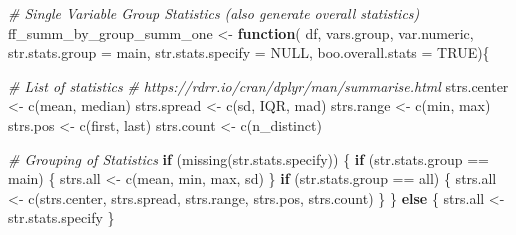 \documentclass[
]{book}
\newenvironment{Shaded}{\begin{snugshade}}{\end{snugshade}}
\newcommand{\AttributeTok}[1]{\textcolor[rgb]{0.77,0.63,0.00}{#1}}
\newcommand{\CommentTok}[1]{\textcolor[rgb]{0.56,0.35,0.01}{\textit{#1}}}
\newcommand{\ConstantTok}[1]{\textcolor[rgb]{0.00,0.00,0.00}{#1}}
\newcommand{\ControlFlowTok}[1]{\textcolor[rgb]{0.13,0.29,0.53}{\textbf{#1}}}
\newcommand{\FunctionTok}[1]{\textcolor[rgb]{0.00,0.00,0.00}{#1}}
\newcommand{\NormalTok}[1]{#1}
\newcommand{\OtherTok}[1]{\textcolor[rgb]{0.56,0.35,0.01}{#1}}
\newcommand{\SpecialCharTok}[1]{\textcolor[rgb]{0.00,0.00,0.00}{#1}}
\newcommand{\StringTok}[1]{\textcolor[rgb]{0.31,0.60,0.02}{#1}}
\begin{document}
\begin{Shaded}
\begin{Highlighting}[]
\CommentTok{\# Single Variable Group Statistics (also generate overall statistics)}
\NormalTok{ff\_summ\_by\_group\_summ\_one }\OtherTok{\textless{}{-}} \ControlFlowTok{function}\NormalTok{(}
\NormalTok{  df, vars.group, var.numeric, }\AttributeTok{str.stats.group =} \StringTok{\textquotesingle{}main\textquotesingle{}}\NormalTok{,}
  \AttributeTok{str.stats.specify =} \ConstantTok{NULL}\NormalTok{, }\AttributeTok{boo.overall.stats =} \ConstantTok{TRUE}\NormalTok{)\{}
  
  \CommentTok{\# List of statistics}
  \CommentTok{\# https://rdrr.io/cran/dplyr/man/summarise.html}
\NormalTok{  strs.center }\OtherTok{\textless{}{-}} \FunctionTok{c}\NormalTok{(}\StringTok{\textquotesingle{}mean\textquotesingle{}}\NormalTok{, }\StringTok{\textquotesingle{}median\textquotesingle{}}\NormalTok{)}
\NormalTok{  strs.spread }\OtherTok{\textless{}{-}} \FunctionTok{c}\NormalTok{(}\StringTok{\textquotesingle{}sd\textquotesingle{}}\NormalTok{, }\StringTok{\textquotesingle{}IQR\textquotesingle{}}\NormalTok{, }\StringTok{\textquotesingle{}mad\textquotesingle{}}\NormalTok{)}
\NormalTok{  strs.range }\OtherTok{\textless{}{-}} \FunctionTok{c}\NormalTok{(}\StringTok{\textquotesingle{}min\textquotesingle{}}\NormalTok{, }\StringTok{\textquotesingle{}max\textquotesingle{}}\NormalTok{)}
\NormalTok{  strs.pos }\OtherTok{\textless{}{-}} \FunctionTok{c}\NormalTok{(}\StringTok{\textquotesingle{}first\textquotesingle{}}\NormalTok{, }\StringTok{\textquotesingle{}last\textquotesingle{}}\NormalTok{)}
\NormalTok{  strs.count }\OtherTok{\textless{}{-}} \FunctionTok{c}\NormalTok{(}\StringTok{\textquotesingle{}n\_distinct\textquotesingle{}}\NormalTok{)}
  
  \CommentTok{\# Grouping of Statistics}
  \ControlFlowTok{if}\NormalTok{ (}\FunctionTok{missing}\NormalTok{(str.stats.specify)) \{}
    \ControlFlowTok{if}\NormalTok{ (str.stats.group }\SpecialCharTok{==} \StringTok{\textquotesingle{}main\textquotesingle{}}\NormalTok{) \{}
\NormalTok{      strs.all }\OtherTok{\textless{}{-}} \FunctionTok{c}\NormalTok{(}\StringTok{\textquotesingle{}mean\textquotesingle{}}\NormalTok{, }\StringTok{\textquotesingle{}min\textquotesingle{}}\NormalTok{, }\StringTok{\textquotesingle{}max\textquotesingle{}}\NormalTok{, }\StringTok{\textquotesingle{}sd\textquotesingle{}}\NormalTok{)}
\NormalTok{    \}}
    \ControlFlowTok{if}\NormalTok{ (str.stats.group }\SpecialCharTok{==} \StringTok{\textquotesingle{}all\textquotesingle{}}\NormalTok{) \{}
\NormalTok{      strs.all }\OtherTok{\textless{}{-}} \FunctionTok{c}\NormalTok{(strs.center, strs.spread, strs.range, strs.pos, strs.count)}
\NormalTok{    \}}
\NormalTok{  \} }\ControlFlowTok{else}\NormalTok{ \{}
\NormalTok{    strs.all }\OtherTok{\textless{}{-}}\NormalTok{ str.stats.specify}
\NormalTok{  \}}
  

\end{Highlighting}
\end{Shaded}
\end{document}
